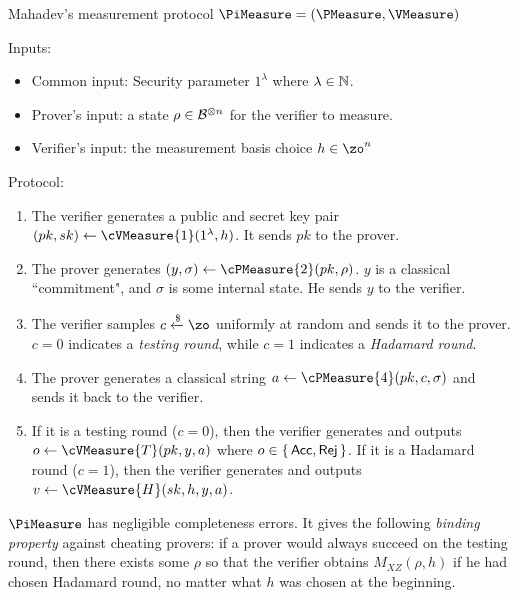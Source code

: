 \begin{protocol}{Mahadev's measurement protocol $\PiMeasure=(\PMeasure, \VMeasure)$}
	\label{proto:urmila4}

	Inputs:
	\begin{itemize}
		\item Common input: Security parameter $1^\lambda$ where $\lambda\in\mathbb{N}$.
		\item Prover's input: a state $\rho\in\mathcal{B}^{\otimes n}$ for the verifier to measure.
		\item Verifier's input: the measurement basis choice $h \in \zo^n$
	\end{itemize}

	Protocol:
	\begin{enumerate}
		\item \label{step:measure1} The verifier generates a public and secret key pair $(pk, sk)\leftarrow\cVMeasure{1}(1^\lambda, h)$. It sends $pk$ to the prover.
		\item \label{step:measure2} The prover generates $(y, \sigma)\leftarrow\cPMeasure{2}(pk, \rho)$.
			$y$ is a classical ``commitment", and $\sigma$ is some internal state.
			He sends $y$ to the verifier.
		\item \label{step:measure3} The verifier samples $c\xleftarrow{\$}\zo$ uniformly at random and sends it to the prover. $c=0$ indicates a \emph{testing round}, while $c=1$ indicates a \emph{Hadamard round}.
		\item \label{step:measure4} The prover generates a classical string $a\leftarrow\cPMeasure{4}(pk, c, \sigma)$ and sends it back to the verifier.
		\item \label{step:output} If it is a testing round ($c=0$), then the verifier generates and outputs $o\leftarrow\cVMeasure{T}(pk, y, a)$ where $o\in\set{\mathsf{Acc}, \mathsf{Rej}}$.
			If it is a Hadamard round ($c=1$), then the verifier generates and outputs $v\leftarrow\cVMeasure{H}(sk, h, y, a)$.
	\end{enumerate}
\end{protocol}

$\PiMeasure$ has negligible completeness errors.
It gives the following \emph{binding property} against cheating provers:
if a prover would always succeed on the testing round, then there exists some $\rho$ so that the verifier obtains $M_{XZ}(\rho, h)$ if he had chosen Hadamard round, no matter what $h$ was chosen at the beginning.

